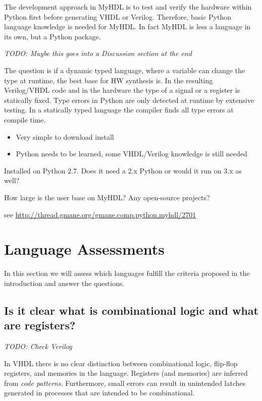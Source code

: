 \documentclass[10pt, conference, compsocconf]{IEEEtran}
\newcommand{\todo}[1]{{\emph{TODO: #1}}}
\begin{document}
The development approach in MyHDL is to test and verify the hardware within Python first
before generating VHDL or Verilog. Therefore, basic Python language knowledge is
needed for MyHDL. In fact MyHDL is less a language in its own, but a Python package.

\todo{Maybe this goes into a Discussion section at the end}

The question is if a dynamic typed language, where a variable can change the type
at runtime, the best base for HW synthesis is. In the resulting Verilog/VHDL code and
in the hardware the type of a signal or a register is statically fixed. Type errors in
Python are only detected at runtime by extensive testing. In a statically typed
language the compiler finds all type errors at compile time.





\begin{itemize}
\item Very simple to download install
\item Python needs to be learned, some VHDL/Verilog knowledge is still needed
\end{itemize}

Installed on Python 2.7. Does it need a 2.x Python or would it run on 3.x as well?

How large is the user base on MyHDL? Any open-source projects?

see \url{http://thread.gmane.org/gmane.comp.python.myhdl/2701}

\section{Language Assessments}

In this section we will assess which languages fulfill the criteria proposed in
the introduction and answer the questions.

\subsection{Is it clear what is combinational logic and what are registers?}

\todo{Check Verilog}

In VHDL there is no clear distinction between combinational logic, flip-flop
registers,  and memories in the language. Registers (and memories) are
inferred from \emph{code patterns}. Furthermore, small errors can result
in unintended latches generated in processes that are intended to be combinational.
\end{document}
